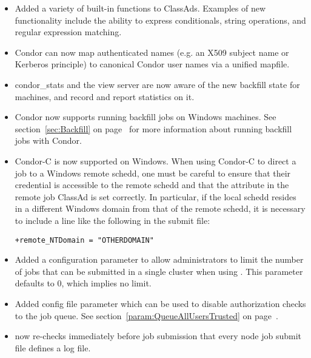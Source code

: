 \begin{itemize}

\item Added a variety of built-in functions to ClassAds. Examples of
new functionality include the ability to express conditionals, string
operations, and regular expression matching.

\item Condor can now map authenticated names (e.g. an X509 subject
name or Kerberos principle) to canonical Condor user names via a
unified mapfile.

\item condor\_stats and the view server are now aware of the new backfill
state for machines, and record and report statistics on it.

\item Condor now supports running backfill jobs on Windows machines.
  See section~\ref{sec:Backfill} on page~\pageref{sec:Backfill} for
  more information about running backfill jobs with Condor.

\item Condor-C is now supported on Windows. When using Condor-C to
direct a job to a Windows remote schedd, one must be careful to ensure
that their credential is accessible to the remote schedd and that the
 attribute in the remote job ClassAd is set
correctly. In particular, if the local schedd resides in a different
Windows domain from that of the remote schedd, it is necessary to
include a line like the following in the submit file:
\begin{verbatim}
+remote_NTDomain = "OTHERDOMAIN"
\end{verbatim}

\item Added a  configuration
parameter to allow administrators to limit the number of jobs that can
be submitted in a single cluster when using . This
parameter defaults to 0, which implies no limit.

\item Added config file parameter  which can
be used to disable authorization checks to the job queue.  See
section~\ref{param:QueueAllUsersTrusted} on
page~\pageref{param:QueueAllUsersTrusted}.

\item {} now re-checks immediately before job submission
that every node job submit file defines a log file.


\end{itemize}
